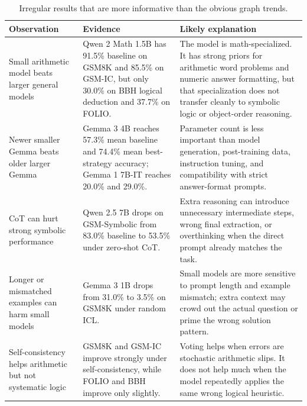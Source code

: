 \documentclass[10pt,twocolumn]{article}
\begin{document}
\begin{table}[t]
\centering
\caption{Irregular results that are more informative than the obvious graph trends.}
\label{tab:irregularities}
\begin{tabularx}{\textwidth}{>{\raggedright\arraybackslash}p{}>{\raggedright\arraybackslash}p{}>{\raggedright\arraybackslash}X}
\toprule
Observation & Evidence & Likely explanation\\
\midrule
Small arithmetic model beats larger general models & Qwen 2 Math 1.5B has 91.5\% baseline on GSM8K and 85.5\% on GSM-IC, but only 30.0\% on BBH logical deduction and 37.7\% on FOLIO. & The model is math-specialized. It has strong priors for arithmetic word problems and numeric answer formatting, but that specialization does not transfer cleanly to symbolic logic or object-order reasoning.\\
\addlinespace
Newer smaller Gemma beats older larger Gemma & Gemma 3 4B reaches 57.3\% mean baseline and 74.4\% mean best-strategy accuracy; Gemma 1 7B-IT reaches 20.0\% and 29.0\%. & Parameter count is less important than model generation, post-training data, instruction tuning, and compatibility with strict answer-format prompts.\\
\addlinespace
CoT can hurt strong symbolic performance & Qwen 2.5 7B drops on GSM-Symbolic from 83.0\% baseline to 53.5\% under zero-shot CoT. & Extra reasoning can introduce unnecessary intermediate steps, wrong final extraction, or overthinking when the direct prompt already matches the task.\\
\addlinespace
Longer or mismatched examples can harm small models & Gemma 3 1B drops from 31.0\% to 3.5\% on GSM8K under random ICL. & Small models are more sensitive to prompt length and example mismatch; extra context may crowd out the actual question or prime the wrong solution pattern.\\
\addlinespace
Self-consistency helps arithmetic but not systematic logic & GSM8K and GSM-IC improve strongly under self-consistency, while FOLIO and BBH improve only slightly. & Voting helps when errors are stochastic arithmetic slips. It does not help much when the model repeatedly applies the same wrong logical heuristic.\\
\bottomrule
\end{tabularx}
\end{table}
\end{document}
